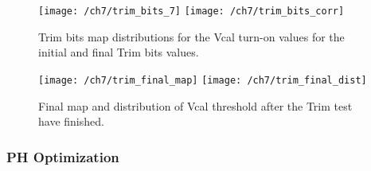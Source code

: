 \begin{figure}[!h]
  \centering
  \texttt{[image: /ch7/trim\_bits\_7]}
  \texttt{[image: /ch7/trim\_bits\_corr]}
  \caption[Trim test Trim bits]{Trim bits map distributions for the Vcal turn-on values for the initial  and final Trim bits values.}\label{fig:trim_bits}
\end{figure}

\begin{figure}[!h]
  \centering
  \texttt{[image: /ch7/trim\_final\_map]}
  \texttt{[image: /ch7/trim\_final\_dist]}
  \caption[Trim test final]{Final map and distribution of Vcal threshold after the Trim test have finished.}\label{fig:trim_final}
\end{figure}

\subsubsection{PH Optimization}





